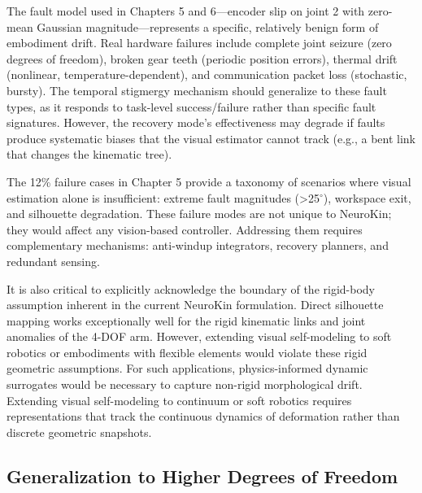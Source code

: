 \documentclass[12pt,a4paper,oneside]{report}
\begin{document}
The fault model used in Chapters 5 and 6---encoder slip on joint 2 with zero-mean Gaussian magnitude---represents a specific, relatively benign form of embodiment drift. Real hardware failures include complete joint seizure (zero degrees of freedom), broken gear teeth (periodic position errors), thermal drift (nonlinear, temperature-dependent), and communication packet loss (stochastic, bursty). The temporal stigmergy mechanism should generalize to these fault types, as it responds to task-level success/failure rather than specific fault signatures. However, the recovery mode's effectiveness may degrade if faults produce systematic biases that the visual estimator cannot track (e.g., a bent link that changes the kinematic tree).

The 12\% failure cases in Chapter 5 provide a taxonomy of scenarios where visual estimation alone is insufficient: extreme fault magnitudes (>25$^\circ$), workspace exit, and silhouette degradation. These failure modes are not unique to NeuroKin; they would affect any vision-based controller. Addressing them requires complementary mechanisms: anti-windup integrators, recovery planners, and redundant sensing.

It is also critical to explicitly acknowledge the boundary of the rigid-body assumption inherent in the current NeuroKin formulation. Direct silhouette mapping works exceptionally well for the rigid kinematic links and joint anomalies of the 4-DOF arm. However, extending visual self-modeling to soft robotics or embodiments with flexible elements would violate these rigid geometric assumptions. For such applications, physics-informed dynamic surrogates would be necessary to capture non-rigid morphological drift. Extending visual self-modeling to continuum or soft robotics requires representations that track the continuous dynamics of deformation rather than discrete geometric snapshots.

\subsection{Generalization to Higher Degrees of Freedom}
\end{document}

